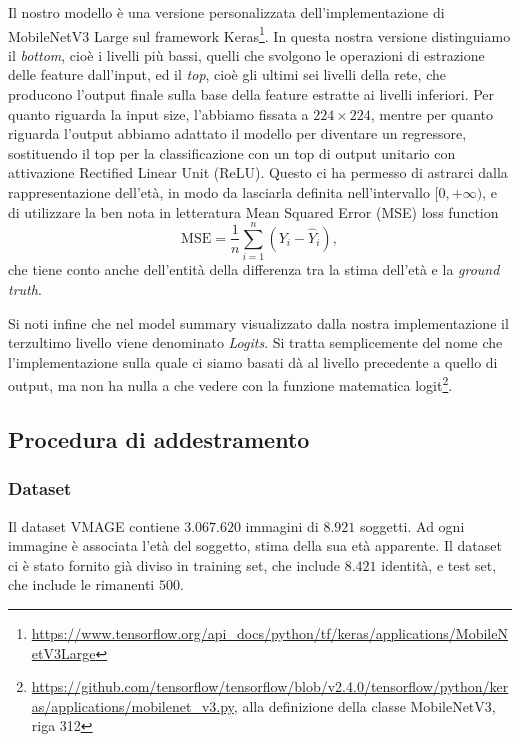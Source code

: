 Il nostro modello è una versione personalizzata dell'implementazione di MobileNetV3 Large sul framework Keras\footnote{\url{https://www.tensorflow.org/api_docs/python/tf/keras/applications/MobileNetV3Large}}. In questa nostra versione distinguiamo il \emph{bottom}, cioè i livelli più bassi, quelli che svolgono le operazioni di estrazione delle feature dall'input, ed il \emph{top}, cioè gli ultimi sei livelli della rete, che producono l'output finale sulla base della feature estratte ai livelli inferiori. Per quanto riguarda la input size, l'abbiamo fissata a $224 \times 224$, mentre per quanto riguarda l'output abbiamo adattato il modello per diventare un regressore, sostituendo il top per la classificazione con un top di output unitario con attivazione Rectified Linear Unit (ReLU). Questo ci ha permesso di astrarci dalla rappresentazione dell'età, in modo da lasciarla definita nell'intervallo \([0, +\infty)\), e di utilizzare la ben nota in letteratura Mean Squared Error (MSE) loss function
\begin{displaymath}
\text{MSE} = \frac{1}{n} \sum_{i=1}^{n} \left(Y_i - \hat{Y}_i\right),
\end{displaymath}
che tiene conto anche dell'entità della differenza tra la stima dell'età e la \emph{ground truth}.

Si noti infine che nel model summary visualizzato dalla nostra implementazione il terzultimo livello viene denominato \emph{Logits}. Si tratta semplicemente del nome che l'implementazione sulla quale ci siamo basati dà al livello precedente a quello di output, ma non ha nulla a che vedere con la funzione matematica logit\footnote{\url{https://github.com/tensorflow/tensorflow/blob/v2.4.0/tensorflow/python/keras/applications/mobilenet_v3.py}, alla definizione della classe MobileNetV3, riga 312}.

\subsection{Procedura di addestramento}
\subsubsection{Dataset}
\label{subsubsec:dataset}

Il dataset VMAGE contiene $3.067.620$ immagini di $8.921$ soggetti. Ad ogni immagine è associata l'età del soggetto, stima della sua età apparente.
Il dataset ci è stato fornito già diviso in training set, che include $8.421$ identità, e test set, che include le rimanenti $500$.

